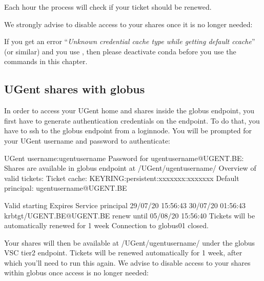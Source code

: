 \begin{prompt}
\end{prompt}

Each hour the process will check if your ticket should be renewed.


We strongly advise to disable access to your shares once it is no longer needed:

\begin{prompt}
\end{prompt}

If you get an error ``\emph{Unknown credential cache type while getting default ccache}''
(or similar) and you use , then please deactivate conda before you use the commands
in this chapter.

\begin{prompt}
\end{prompt}

\subsection{UGent shares with globus \label{subsec:globus-ugent-shares}}

In order to access your UGent home and shares inside the globus endpoint,
you first have to generate authentication credentials on the endpoint.
To do that, you have to ssh to the globus endpoint from a loginnode.
You will be prompted for your UGent username and password to authenticate:

\begin{prompt}
UGent username:ugentusername
Password for ugentusername@UGENT.BE:
Shares are available in globus endpoint at /UGent/ugentusername/
Overview of valid tickets:
Ticket cache: KEYRING:persistent:xxxxxxx:xxxxxxx
Default principal: ugentusername@UGENT.BE

Valid starting     Expires            Service principal
29/07/20 15:56:43  30/07/20 01:56:43  krbtgt/UGENT.BE@UGENT.BE
	renew until 05/08/20 15:56:40
Tickets will be automatically renewed for 1 week
Connection to globus01 closed.
\end{prompt}

Your shares will then be available at /UGent/ugentusername/ under the globus VSC tier2 endpoint.
Tickets will be renewed automatically for 1 week,
after which you'll need to run this again.
We advise to disable access to your shares within globus once access is no longer needed:

